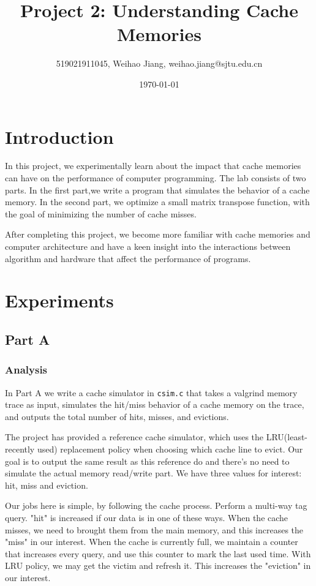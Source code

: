 \documentclass{article}
\title{\textbf{Project 2:  Understanding Cache Memories}} %
\author{519021911045, Weihao Jiang, weihao.jiang@sjtu.edu.cn} %
\date{\today} %
\begin{document}
\maketitle %

\section{Introduction}

In this project, we experimentally learn about the impact that cache memories can have on the performance of computer programming. The lab consists of two parts. In the first part,we write a  program that simulates the behavior of a cache memory. In the second part, we optimize a small matrix transpose function, with the goal of minimizing the number of cache misses.

After completing this project, we become more familiar with cache memories and computer architecture and have a keen insight into the interactions between algorithm and hardware that affect the performance of programs.

\section{Experiments}

\subsection{Part A}

\subsubsection{Analysis}

In Part A we write a cache simulator in \texttt{csim.c} that takes a valgrind memory trace as input, simulates the hit/miss behavior of a cache memory on the trace, and outputs the total number of hits, misses, and evictions.

The project has provided a reference cache simulator, which uses the LRU(least-recently used) replacement policy when choosing which cache line to evict. Our goal is to output the same result as this reference do and there's no need to simulate the actual memory read/write part. We have three values for interest: hit, miss and eviction.

Our jobs here is simple, by following the cache process. Perform a multi-way tag query. "hit" is increased if our data is in one of these ways. When the cache misses, we need to brought them from the main memory, and this increases the "miss" in our interest. When the cache is currently full, we maintain a counter that increases every query, and use this counter to mark the last used time. With LRU policy, we may get the victim and refresh it. This increases the "eviction" in our interest.
\end{document}
